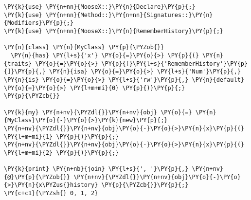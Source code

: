 \begin{Verbatim}[commandchars=\\\{\}]
\PY{k}{use} \PY{n+nn}{MooseX::}\PY{n}{Declare}\PY{p}{;}
\PY{k}{use} \PY{n+nn}{Method::}\PY{n+nn}{Signatures::}\PY{n}{Modifiers}\PY{p}{;}
\PY{k}{use} \PY{n+nn}{MooseX::}\PY{n}{RememberHistory}\PY{p}{;}

\PY{n}{class} \PY{n}{MyClass} \PY{p}{\PYZob{}}
  \PY{n}{has} \PY{l+s}{'x'} \PY{o}{=}\PY{o}{>} \PY{p}{(} \PY{n}{traits} \PY{o}{=}\PY{o}{>} \PY{p}{[}\PY{l+s}{'RememberHistory'}\PY{p}{]}\PY{p}{,} \PY{n}{isa} \PY{o}{=}\PY{o}{>} \PY{l+s}{'Num'}\PY{p}{,} \PY{n}{is} \PY{o}{=}\PY{o}{>} \PY{l+s}{'rw'}\PY{p}{,} \PY{n}{default} \PY{o}{=}\PY{o}{>} \PY{l+m+mi}{0} \PY{p}{)}\PY{p}{;}
\PY{p}{\PYZcb{}}

\PY{k}{my} \PY{n+nv}{\PYZdl{}}\PY{n+nv}{obj} \PY{o}{=} \PY{n}{MyClass}\PY{o}{-}\PY{o}{>}\PY{k}{new}\PY{p}{;}
\PY{n+nv}{\PYZdl{}}\PY{n+nv}{obj}\PY{o}{-}\PY{o}{>}\PY{n}{x}\PY{p}{(} \PY{l+m+mi}{1} \PY{p}{)}\PY{p}{;}
\PY{n+nv}{\PYZdl{}}\PY{n+nv}{obj}\PY{o}{-}\PY{o}{>}\PY{n}{x}\PY{p}{(} \PY{l+m+mi}{2} \PY{p}{)}\PY{p}{;}

\PY{k}{print} \PY{n+nb}{join} \PY{l+s}{', '}\PY{p}{,} \PY{n+nv}{@}\PY{p}{\PYZob{}} \PY{n+nv}{\PYZdl{}}\PY{n+nv}{obj}\PY{o}{-}\PY{o}{>}\PY{n}{x\PYZus{}history} \PY{p}{\PYZcb{}}\PY{p}{;}
\PY{c+c1}{\PYZsh{} 0, 1, 2}
\end{Verbatim}
